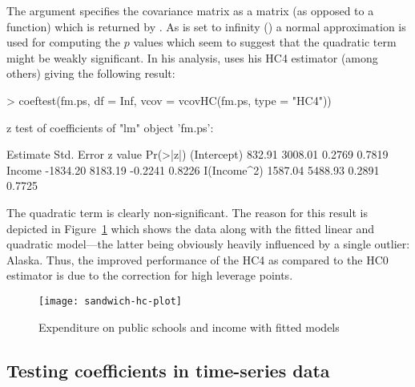 \documentclass{Z}
\begin{document}
The  argument specifies the covariance matrix as a matrix
(as opposed to a function) which is returned by .
As  is set to infinity () a normal approximation is used
for computing the $p$ values which seem to suggest that the quadratic term
might be weakly significant. In his analysis, \cite{hac:Cribari-Neto:2004} uses his HC4 estimator
(among others) giving the following result:
\begin{Schunk}
\begin{Sinput}
> coeftest(fm.ps, df = Inf, vcov = vcovHC(fm.ps, type = "HC4"))
\end{Sinput}
\begin{Soutput}
z test of coefficients of "lm" object 'fm.ps':

            Estimate Std. Error z value Pr(>|z|)
(Intercept)   832.91    3008.01  0.2769   0.7819
Income      -1834.20    8183.19 -0.2241   0.8226
I(Income^2)  1587.04    5488.93  0.2891   0.7725
\end{Soutput}
\end{Schunk}
The quadratic term is clearly non-significant. The reason for this result is
depicted in Figure~\ref{fig:hc} which shows the data along with the fitted linear
and quadratic model---the latter being obviously heavily influenced by a single outlier: 
Alaska. Thus, the improved performance of the HC4 as compared to
the HC0 estimator is due to the correction for high leverage points.

\begin{figure}[tbh]
\begin{center}
\texttt{[image: sandwich-hc-plot]}
\caption{\label{fig:hc} Expenditure on public schools and income with fitted models}
\end{center}
\end{figure}


\subsection{Testing coefficients in time-series data}
\end{document}
